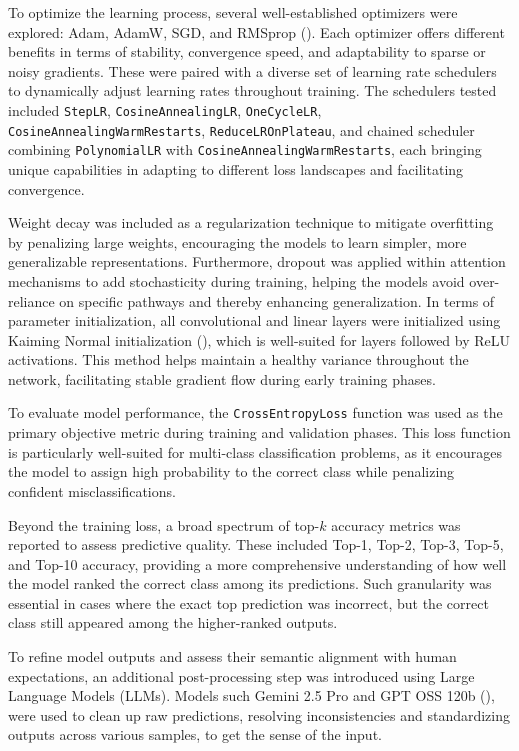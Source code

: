 \documentclass[a4paper,11pt,twoside]{report}
\theoremstyle{definition}
\begin{document}
To optimize the learning process, several well-established optimizers were explored: Adam, AdamW, SGD, and RMSprop (\cite{optimizers}). Each optimizer offers different benefits in terms of stability, convergence speed, and adaptability to sparse or noisy gradients. These were paired with a diverse set of learning rate schedulers to dynamically adjust learning rates throughout training. The schedulers tested included \texttt{StepLR}, \texttt{CosineAnnealingLR}, \texttt{OneCycleLR}, \texttt{CosineAnnealingWarmRestarts}, \texttt{ReduceLROnPlateau}, and chained scheduler combining \texttt{PolynomialLR} with \texttt{CosineAnnealingWarmRestarts}, each bringing unique capabilities in adapting to different loss landscapes and facilitating convergence.

Weight decay was included as a regularization technique to mitigate overfitting by penalizing large weights, encouraging the models to learn simpler, more generalizable representations. Furthermore, dropout was applied within attention mechanisms to add stochasticity during training, helping the models avoid over-reliance on specific pathways and thereby enhancing generalization. In terms of parameter initialization, all convolutional and linear layers were initialized using Kaiming Normal initialization (\cite{kaiming}), which is well-suited for layers followed by ReLU activations. This method helps maintain a healthy variance throughout the network, facilitating stable gradient flow during early training phases.

\vspace{0.3cm}

To evaluate model performance, the \texttt{CrossEntropyLoss} function was used as the primary objective metric during training and validation phases. This loss function is particularly well-suited for multi-class classification problems, as it encourages the model to assign high probability to the correct class while penalizing confident misclassifications.

Beyond the training loss, a broad spectrum of top-$k$ accuracy metrics was reported to assess predictive quality. These included Top-1, Top-2, Top-3, Top-5, and Top-10 accuracy, providing a more comprehensive understanding of how well the model ranked the correct class among its predictions. Such granularity was essential in cases where the exact top prediction was incorrect, but the correct class still appeared among the higher-ranked outputs.

To refine model outputs and assess their semantic alignment with human expectations, an additional post-processing step was introduced using Large Language Models (LLMs). Models such Gemini 2.5 Pro \footnotemark and GPT OSS 120b (\cite{gpt-oss}), were used to clean up raw predictions, resolving inconsistencies and standardizing outputs across various samples, to get the sense of the input.
\end{document}
